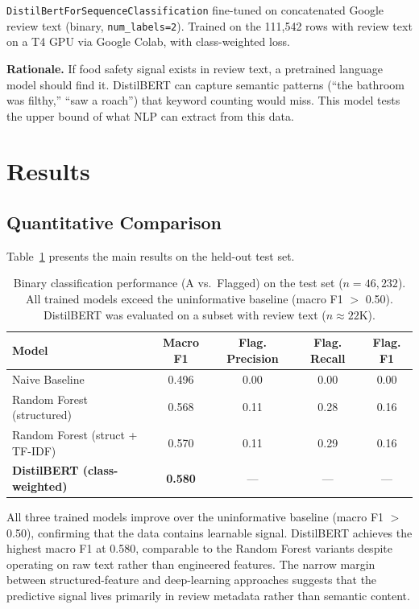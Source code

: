 \documentclass{article}
\begin{document}
\texttt{DistilBertForSequenceClassification} fine-tuned on concatenated Google review text (binary, \texttt{num\_labels=2}). Trained on the 111,542 rows with review text on a T4 GPU via Google Colab, with class-weighted loss.

\textbf{Rationale.} If food safety signal exists in review text, a pretrained language model should find it. DistilBERT can capture semantic patterns (``the bathroom was filthy,'' ``saw a roach'') that keyword counting would miss. This model tests the upper bound of what NLP can extract from this data.

\section{Results}

\subsection{Quantitative Comparison}

Table~\ref{tab:results} presents the main results on the held-out test set.

\begin{table}[h]
\centering
\caption{Binary classification performance (A vs.\ Flagged) on the test set ($n=46{,}232$). All trained models exceed the uninformative baseline (macro F1 $>$ 0.50). DistilBERT was evaluated on a subset with review text ($n \approx 22$K).}
\label{tab:results}
\begin{tabular}{lcccc}
\toprule
\textbf{Model} & \textbf{Macro F1} & \textbf{Flag. Precision} & \textbf{Flag. Recall} & \textbf{Flag. F1} \\
\midrule
Naive Baseline & 0.496 & 0.00 & 0.00 & 0.00 \\
Random Forest (structured) & 0.568 & 0.11 & 0.28 & 0.16 \\
Random Forest (struct + TF-IDF) & 0.570 & 0.11 & 0.29 & 0.16 \\
\textbf{DistilBERT (class-weighted)} & \textbf{0.580} & --- & --- & --- \\
\bottomrule
\end{tabular}
\end{table}

All three trained models improve over the uninformative baseline (macro F1 $>$ 0.50), confirming that the data contains learnable signal. DistilBERT achieves the highest macro F1 at 0.580, comparable to the Random Forest variants despite operating on raw text rather than engineered features. The narrow margin between structured-feature and deep-learning approaches suggests that the predictive signal lives primarily in review metadata rather than semantic content.
\end{document}

